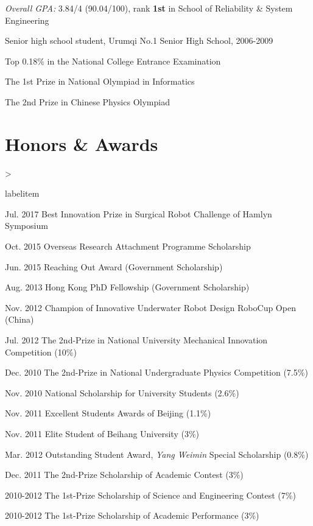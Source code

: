 \documentclass[10pt,letterpaper]{article}
\makeatletter
\newenvironment{dateitemize}%
{\ifnum \@itemdepth >\thr@@\@toodeep\else
\advance\@itemdepth\@ne
\edef\@itemitem{labelitem\romannumeral\the\@itemdepth}%
\expandafter
\list
\csname\@itemitem\endcsname
{\advance\rightmargin3cm
\def\makelabel##1{\hss\llap{\textbullet}\rlap{\hbox to \dimexpr\linewidth+\rightmargin+\itemsep\relax{\hss##1}}}}%
\fi}
{\endlist}%
\renewenvironment{itemize}{
\begin{list}{}{
    \setlength{\leftmargin}{1.5em}
    \setlength{\itemsep}{0.25em}
    \setlength{\parskip}{0pt}
    \setlength{\parsep}{0.25em}
    }
    }{
\end{list}
}
\makeatother
\begin{document}
\begin{itemize}
\begin{itemize}
        \item \emph{Overall GPA:} 3.84/4 (90.04/100), rank \textbf{1st} in School of Reliability \& System Engineering
    \end{itemize}
    \item Senior high school student, Urumqi No.1 Senior High School, 2006-2009
    \begin{itemize}
        \item Top 0.18\% in the National College Entrance Examination
        \item The 1st Prize in National Olympiad in Informatics
        \item The 2nd Prize in Chinese Physics Olympiad
    \end{itemize}
\end{itemize}

\section*{Honors \& Awards}

\begin{dateitemize}
    \item[Jul. 2017] Best Innovation Prize in Surgical Robot Challenge of Hamlyn Symposium
    \item[Oct. 2015] Overseas Research Attachment Programme Scholarship
    \item[Jun. 2015] Reaching Out Award (Government Scholarship)
    \item[Aug. 2013] Hong Kong PhD Fellowship (Government Scholarship)
    \item[Nov. 2012] Champion of Innovative Underwater Robot Design RoboCup Open (China)
    \item[Jul. 2012] The 2nd-Prize in National University Mechanical Innovation Competition (10\%)
    \item[Dec. 2010] The 2nd-Prize in National Undergraduate Physics Competition (7.5\%)
    \item[Nov. 2010] National Scholarship for University Students (2.6\%)
    \item[Nov. 2011] Excellent Students Awards of Beijing (1.1\%)
    \item[Nov. 2011] Elite Student of Beihang University (3\%)
    \item[Mar. 2012] Outstanding Student Award, \textit{Yang Weimin} Special Scholarship (0.8\%)
    \item[Dec. 2011] The 2nd-Prize Scholarship of Academic Contest (3\%)
    \item[2010-2012] The 1st-Prize Scholarship of Science and Engineering Contest (7\%)
    \item[2010-2012] The 1st-Prize Scholarship of Academic Performance (3\%)

\end{dateitemize}
\end{document}
